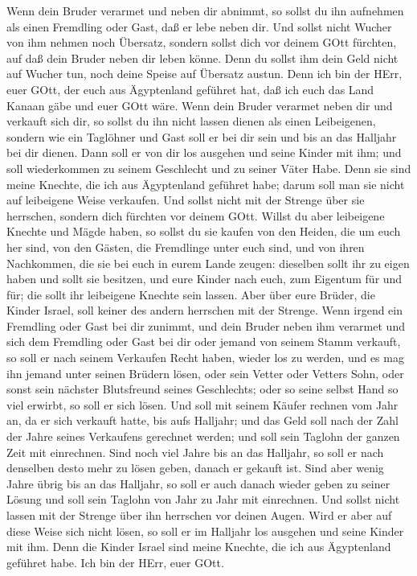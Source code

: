  Wenn dein Bruder verarmet und neben dir abnimmt, so sollst
du ihn aufnehmen als einen Fremdling oder Gast, daß er lebe neben dir.
 Und sollst nicht Wucher von ihm nehmen noch Übersatz,
sondern sollst dich vor deinem GOtt fürchten, auf daß dein Bruder neben
dir leben könne.  Denn du sollst ihm dein Geld nicht auf
Wucher tun, noch deine Speise auf Übersatz austun.  Denn
ich bin der HErr, euer GOtt, der euch aus Ägyptenland geführet hat, daß
ich euch das Land Kanaan gäbe und euer GOtt wäre.  Wenn
dein Bruder verarmet neben dir und verkauft sich dir, so sollst du ihn
nicht lassen dienen als einen Leibeigenen,  sondern wie ein
Taglöhner und Gast soll er bei dir sein und bis an das Halljahr bei dir
dienen.  Dann soll er von dir los ausgehen und seine Kinder
mit ihm; und soll wiederkommen zu seinem Geschlecht und zu seiner Väter
Habe.  Denn sie sind meine Knechte, die ich aus Ägyptenland
geführet habe; darum soll man sie nicht auf leibeigene Weise verkaufen.
 Und sollst nicht mit der Strenge über sie herrschen,
sondern dich fürchten vor deinem GOtt.  Willst du aber
leibeigene Knechte und Mägde haben, so sollst du sie kaufen von den
Heiden, die um euch her sind,  von den Gästen, die
Fremdlinge unter euch sind, und von ihren Nachkommen, die sie bei euch
in eurem Lande zeugen: dieselben sollt ihr zu eigen haben 
und sollt sie besitzen, und eure Kinder nach euch, zum Eigentum für und
für; die sollt ihr leibeigene Knechte sein lassen. Aber über eure
Brüder, die Kinder Israel, soll keiner des andern herrschen mit der
Strenge.  Wenn irgend ein Fremdling oder Gast bei dir
zunimmt, und dein Bruder neben ihm verarmet und sich dem Fremdling oder
Gast bei dir oder jemand von seinem Stamm verkauft,  so
soll er nach seinem Verkaufen Recht haben, wieder los zu werden, und es
mag ihn jemand unter seinen Brüdern lösen,  oder sein
Vetter oder Vetters Sohn, oder sonst sein nächster Blutsfreund seines
Geschlechts; oder so seine selbst Hand so viel erwirbt, so soll er sich
lösen.  Und soll mit seinem Käufer rechnen vom Jahr an, da
er sich verkauft hatte, bis aufs Halljahr; und das Geld soll nach der
Zahl der Jahre seines Verkaufens gerechnet werden; und soll sein Taglohn
der ganzen Zeit mit einrechnen.  Sind noch viel Jahre bis
an das Halljahr, so soll er nach denselben desto mehr zu lösen geben,
danach er gekauft ist.  Sind aber wenig Jahre übrig bis an
das Halljahr, so soll er auch danach wieder geben zu seiner Lösung und
soll sein Taglohn von Jahr zu Jahr mit einrechnen.  Und
sollst nicht lassen mit der Strenge über ihn herrschen vor deinen Augen.
 Wird er aber auf diese Weise sich nicht lösen, so soll er
im Halljahr los ausgehen und seine Kinder mit ihm.  Denn
die Kinder Israel sind meine Knechte, die ich aus Ägyptenland geführet
habe. Ich bin der HErr, euer GOtt.

